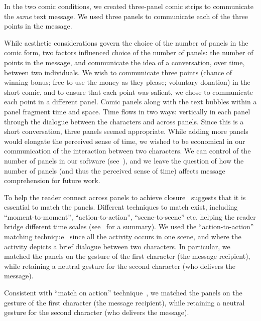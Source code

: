 In the two comic conditions, we created three-panel comic strips to communicate the \textit{same} text message. We used three panels to communicate each of the three points in the message. 



While aesthetic considerations govern the choice of the number of panels in the comic form, two factors influenced choice of the number of panels: the number of points in the message, and communicate the idea of a conversation, over time, between two individuals. We wish to communicate three points (chance of winning bonus; free to use the money as they please; voluntary donation) in the short comic, and to ensure that each point was salient, we chose to communicate each point in a different panel. Comic panels along with the text bubbles within a panel fragment time and space. Time flows in two ways: vertically in each panel through the dialogue between the characters and across panels. Since this is a short conversation, three panels seemed appropriate. While adding more panels would elongate the perceived sense of time, we wished to be economical in our communication of the interaction between two characters. We can control of the number of panels in our software (see~), and we leave the question of how the number of panels (and thus the perceived sense of time) affects message comprehension for future work.

To help the reader connect across panels to achieve closure~\textcite[][Chapter 3]{scott1993understanding} suggests that it is essential to match the panels. Different techniques to match exist, including ``moment-to-moment'', ``action-to-action'', ``scene-to-scene'' etc. helping the reader bridge different time scales (see~\parencite[][p. 71]{scott1993understanding} for a summary). We used the ``action-to-action'' matching technique~\cite{scott1993understanding} since all the activity occurs in one scene, and where the activity depicts a brief dialogue between two characters. In particular, we matched the panels on the gesture of the first character (the message recipient), while retaining a neutral gesture for the second character (who delivers the message). 



Consistent with ``match on action'' technique~\cite{scott1993understanding}, we matched the panels on the gesture of the first character (the message recipient), while retaining a neutral gesture for the second character (who delivers the message). 

